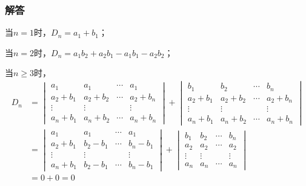 \documentclass[9pt,xcolor=svgnames]{beamer} %
\begin{document}
\begin{frame}
    \frametitle{解答}
    当\(n=1\)时，\(D_n=a_1+b_1\)；

    当\(n=2\)时，\(D_n=a_1b_2+a_2b_1-a_1b_1-a_2b_2\)；
    \pause

    当\(n\geq3\)时，
    \begin{align*}
        D_n & =
        \begin{vmatrix}
            a_{1}       & a_{1}       & \cdots & a_{1}       \\
            a_{2}+b_{1} & a_{2}+b_{2} & \cdots & a_{2}+b_{n} \\
            \vdots      & \vdots      &        & \vdots      \\
            a_{n}+b_{1} & a_{n}+b_{2} & \cdots & a_{n}+b_{n}
        \end{vmatrix}+
        \begin{vmatrix}
            b_{1}       & b_{2}       & \cdots & b_{n}       \\
            a_{2}+b_{1} & a_{2}+b_{2} & \cdots & a_{2}+b_{n} \\
            \vdots      & \vdots      &        & \vdots      \\
            a_{n}+b_{1} & a_{n}+b_{2} & \cdots & a_{n}+b_{n}
        \end{vmatrix} \\
            & =
        \begin{vmatrix}
            a_{1}       & a_{1}       & \cdots & a_{1}       \\
            a_{2}+b_{1} & b_{2}-b_{1} & \cdots & b_{n}-b_{1} \\
            \vdots      & \vdots      &        & \vdots      \\
            a_{n}+b_{1} & b_{2}-b_{1} & \cdots & b_{n}-b_{1}
        \end{vmatrix}+
        \begin{vmatrix}
            b_{1}  & b_{2}  & \cdots & b_{n}  \\
            a_{2}  & a_{2}  & \cdots & a_{2}  \\
            \vdots & \vdots &        & \vdots \\
            a_{n}  & a_{n}  & \cdots & a_{n}
        \end{vmatrix}                \\
            & =0+0=0
    \end{align*}
\end{frame}
\end{document}
